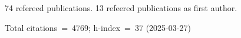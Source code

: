 74 refereed publications. 13 refeered publications as first author.

Total citations~=~4769; h-index~=~37 (2025-03-27)